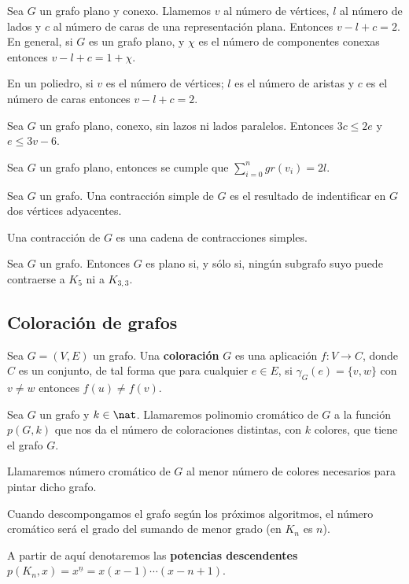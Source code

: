 \begin{nth}
    Sea $G$ un grafo plano y conexo. Llamemos $v$ al número de vértices, $l$ al número de lados y $c$ al número de caras de una representación plana. Entonces $v-l+c= 2$. En general, si $G$ es un grafo plano, y $\chi$ es el número de componentes conexas entonces $v-l+c= 1+\chi $.
\end{nth}
\begin{ncor}
    En un poliedro, si $v$ es el número de vértices; $l$ es el número de aristas y $c$ es el número de caras entonces $v-l+c= 2$.
\end{ncor}
\begin{ncor}
    Sea $G$ un grafo plano, conexo, sin lazos ni lados paralelos. Entonces $3c\leq 2e$ y $e \leq 3v-6$.
\end{ncor}
\begin{nota}
    Sea $G$ un grafo plano, entonces se cumple que $\sum_{i=0}^n gr(v_i)=2l$.
\end{nota}
\begin{ndef}
    Sea $G$ un grafo. Una contracción simple de $G$ es el resultado de indentificar en $G$ dos vértices adyacentes.
\end{ndef}
\begin{nota}
    Una contracción de $G$ es una cadena de contracciones simples.
\end{nota}
\begin{nth}[Kuratowski]
    Sea $G$ un grafo. Entonces $G$ es plano si, y sólo si, ningún subgrafo suyo puede contraerse a $K_5$ ni a $K_{3,3}$.
\end{nth}

\subsection{Coloración de grafos}
\begin{ndef}
    Sea $G= (V, E)$ un grafo. Una \textbf{coloración} $G$ es una aplicación $f:V\to C$, donde $C$ es un conjunto, de tal forma que para cualquier $e\in E$, si $\gamma_G(e) =\{v, w\}$ con $v \neq w$ entonces $f(u)\neq f(v)$.
\end{ndef}
\begin{ndef}
    Sea $G$ un grafo y $k\in\nat$. Llamaremos polinomio cromático de $G$ a la función $p(G, k)$ que nos da el número de coloraciones distintas, con $k$ colores, que tiene el grafo $G$.
\end{ndef}
\begin{ndef}
    Llamaremos número cromático de $G$ al menor número de colores necesarios para pintar dicho grafo.
\end{ndef}
\begin{nota}
    Cuando descompongamos el grafo según los próximos algoritmos, el número cromático será el grado del sumando de menor grado (en $K_n$ es $n$).
\end{nota}
    A partir de aquí denotaremos las \textbf{potencias descendentes} $p(K_n,x) = x^{\underline{n}} = x(x-1)\cdots(x-n+1)$.

